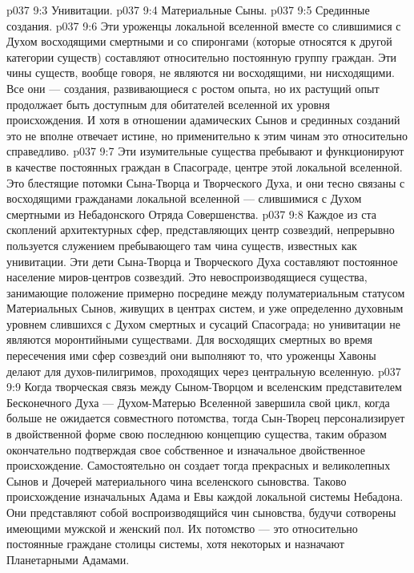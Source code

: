 \vs p037 9:3 \bibnobreakspace Унивитации.
\vs p037 9:4 \bibnobreakspace Материальные Сыны.
\vs p037 9:5 \bibnobreakspace Срединные создания.
\vs p037 9:6 \pc Эти уроженцы локальной вселенной вместе со слившимися с Духом восходящими смертными и со спиронгами (которые относятся к другой категории существ) составляют относительно постоянную группу граждан. Эти чины существ, вообще говоря, не являются ни восходящими, ни нисходящими. Все они --- создания, развивающиеся с ростом опыта, но их растущий опыт продолжает быть доступным для обитателей вселенной их уровня происхождения. И хотя в отношении адамических Сынов и срединных созданий это не вполне отвечает истине, но применительно к этим чинам это относительно справедливо.
\vs p037 9:7 \pc {} Эти изумительные существа пребывают и функционируют в качестве постоянных граждан в Спасограде, центре этой локальной вселенной. Это блестящие потомки Сына\hyp{}Творца и Творческого Духа, и они тесно связаны с восходящими гражданами локальной вселенной --- слившимися с Духом смертными из Небадонского Отряда Совершенства.
\vs p037 9:8 \pc {} Каждое из ста скоплений архитектурных сфер, представляющих центр созвездий, непрерывно пользуется служением пребывающего там чина существ, известных как унивитации. Эти дети Сына\hyp{}Творца и Творческого Духа составляют постоянное население миров\hyp{}центров созвездий. Это невоспроизводящиеся существа, занимающие положение примерно посредине между полуматериальным статусом Материальных Сынов, живущих в центрах систем, и уже определенно духовным уровнем слившихся с Духом смертных и сусаций Спасограда; но унивитации не являются моронтийными существами. Для восходящих смертных во время пересечения ими сфер созвездий они выполняют то, что уроженцы Хавоны делают для духов\hyp{}пилигримов, проходящих через центральную вселенную.
\vs p037 9:9 \pc {} Когда творческая связь между Сыном\hyp{}Творцом и вселенским представителем Бесконечного Духа --- Духом\hyp{}Матерью Вселенной завершила свой цикл, когда больше не ожидается совместного потомства, тогда Сын\hyp{}Творец персонализирует в двойственной форме свою последнюю концепцию существа, таким образом окончательно подтверждая свое собственное и изначальное двойственное происхождение. Самостоятельно он создает тогда прекрасных и великолепных Сынов и Дочерей материального чина вселенского сыновства. Таково происхождение изначальных Адама и Евы каждой локальной системы Небадона. Они представляют собой воспроизводящийся чин сыновства, будучи сотворены имеющими мужской и женский пол. Их потомство --- это относительно постоянные граждане столицы системы, хотя некоторых и назначают Планетарными Адамами.
